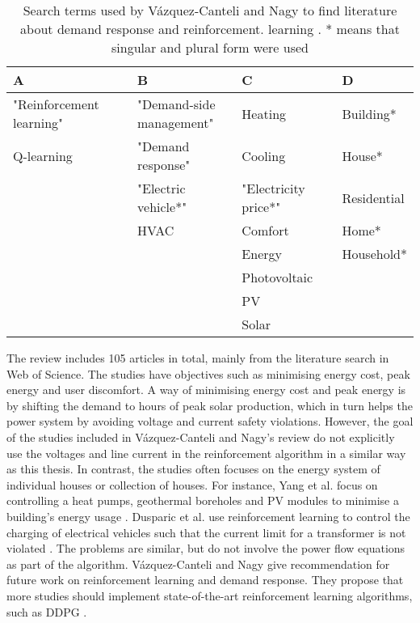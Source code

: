 \documentclass[class=book, crop=false, 11pt]{standalone}
\begin{document}
\begin{table}[ht]
\centering
\caption{Search terms used by Vázquez-Canteli and Nagy to find literature about demand response and reinforcement. learning \cite{vazquez2019reinforcement}. * means that singular and plural form were used}
\begin{tabular}{llll}
A                        & B                        & C                    & D           \\
\hline
"Reinforcement learning" & \makecell[l]{"Demand-side\\management"} & Heating              & Building*   \\
Q-learning               & "Demand response"        & Cooling              & House*      \\
                         & "Electric vehicle*"      & "Electricity price*" & Residential \\
                         & HVAC                     & Comfort              & Home*       \\
                         &                          & Energy               & Household*  \\
                         &                          & Photovoltaic         &             \\
                         &                          & PV                   &             \\
                         &                          & Solar                &            
                        \\
                        \hline
\end{tabular}
\label{table:soa:searchterms}
\end{table}

The review includes 105 articles in total, mainly from the literature search in Web of Science. The studies have objectives such as minimising energy cost, peak energy and user discomfort. A way of minimising energy cost and peak energy is by shifting the demand to hours of peak solar production, which in turn helps the power system by avoiding voltage and current safety violations. However, the goal of the studies included in Vázquez-Canteli and Nagy's review do not explicitly use the voltages and line current in the reinforcement algorithm in a similar way as this thesis. In contrast, the studies often focuses on the energy system of individual houses or collection of houses. For instance,  Yang et al. focus on controlling a heat pumps, geothermal boreholes and PV modules to minimise a building's energy usage \cite{yang2015reinforcement}.  Dusparic et al. use reinforcement learning to control the charging of electrical vehicles such that the current limit for a transformer is not violated \cite{dusparic2013multi}. The problems are similar, but do not involve the power flow equations as part of the algorithm. Vázquez-Canteli and Nagy give recommendation for future work on reinforcement learning and demand response. They propose that more studies should implement state-of-the-art reinforcement learning algorithms, such as DDPG \cite{vazquez2019reinforcement}.   
\end{document}
